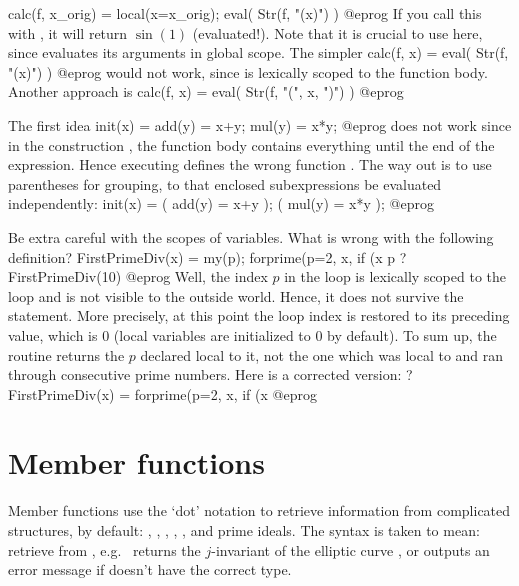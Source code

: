 \bprog
calc(f, x_orig) = local(x=x_orig); eval( Str(f, "(x)") )
@eprog
\noindent If you call this with , it will
return $\sin(1)$ (evaluated!). Note that it is crucial to use 
here, since  evaluates its arguments in global scope. The simpler
\bprog
calc(f, x) = eval( Str(f, "(x)") )
@eprog
would not work, since  is lexically scoped to the function body.
Another approach is
\bprog
calc(f, x) = eval( Str(f, "(", x, ")") )
@eprog


The first idea
\bprog
  init(x) = add(y) = x+y; mul(y) = x*y;
@eprog
\noindent does not work since in the construction , the
function body contains everything until the end of the expression. Hence
executing  defines the wrong function . The way out is to
use parentheses for grouping, to that enclosed subexpressions be
evaluated independently:
\bprog
  init(x) = ( add(y) = x+y ); ( mul(y) = x*y );
@eprog

Be extra careful with the scopes of variables. What is wrong with the
following definition?
\bprog
FirstPrimeDiv(x) =
{ my(p);
  forprime(p=2, x, if (x%
  p
}
? FirstPrimeDiv(10)
@eprog\noindent
Well, the index $p$ in the  loop is lexically scoped to the
loop and is not visible to the outside world. Hence, it does not survive the
 statement. More precisely, at this point the loop index is
restored to its preceding value, which is 0 (local variables are initialized
to 0 by default). To sum up, the routine returns the $p$ declared local to
it, not the one which was local to  and ran through consecutive
prime numbers. Here is a corrected version:
\bprog
? FirstPrimeDiv(x) = forprime(p=2, x, if (x%
@eprog

\section{Member functions} \label{se:member}

Member functions use the `dot' notation to retrieve information from
complicated structures, by default: , , ,
, ,  and prime ideals. The syntax
 is taken to mean: retrieve  from
, e.g.~ returns the $j$-invariant of the elliptic
curve , or outputs an error message if  doesn't have the
correct type.

